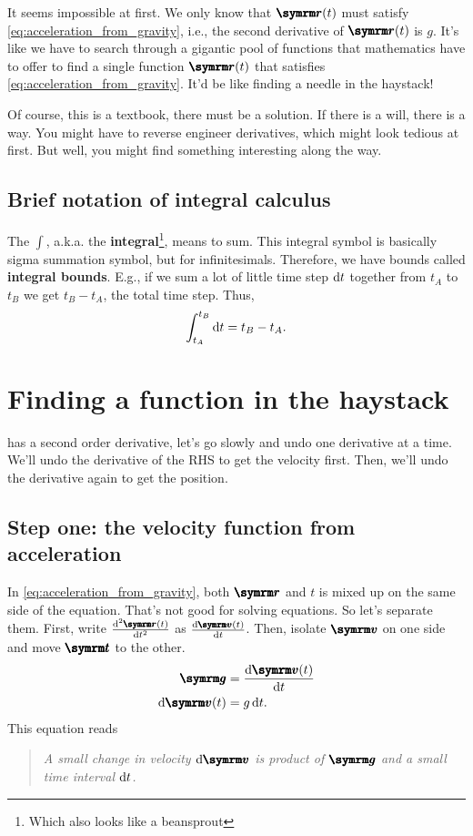 It seems impossible at first. We only know that $\vv{r}(t)$ must satisfy \cref{eq:acceleration_from_gravity}, i.e., the second derivative of $\vv{r}(t)$ is $g$. It's like we have to search through a gigantic pool of functions that mathematics have to offer to find a single function $\vv{r}(t)$ that satisfies \cref{eq:acceleration_from_gravity}. It'd be like finding a needle in the haystack!

Of course, this is a textbook, there must be a solution. If there is a will, there is a way. You might have to reverse engineer derivatives, which might look tedious at first. But well, you might find something interesting along the way.

\subsection{Brief notation of integral calculus}
\label{sec:brief_notation_of_calculus_integral}

The $\int$, a.k.a. the \textbf{integral}\footnote{Which also looks like a beansprout}, means to sum. This integral symbol is basically sigma summation symbol, but for infinitesimals. Therefore, we have bounds called \textbf{integral bounds}. E.g., if we sum a lot of little time step $\odif{t}$ together from $t_A$ to $t_B$ we get $t_B - t_A$, the total time step. Thus,
\begin{equation}
    \int_{t_A}^{t_B}\odif{t} = t_B - t_A.
\end{equation}

\section{Finding a function in the haystack}
\label{sec:function_in_the_haystack}

 has a second order derivative, let's go slowly and undo one derivative at a time. We'll undo the derivative of the RHS to get the velocity first. Then, we'll undo the derivative again to get the position.

\subsection{Step one: the velocity function from acceleration}

In \cref{eq:acceleration_from_gravity}, both $\vv{r}$ and $t$ is mixed up on the same side of the equation. That's not good for solving equations. So let's separate them. First, write $\odv[ord = 2]{\vv{r}(t)}{t}$ as $\odv{\vv{v}(t)}{t}$. Then, isolate $\vv{v}$ on one side and move $\vv{t}$ to the other.
\begin{align}
    \vv{g} &= \odv{\vv{v}(t)}{t} \\
    \odif{\vv{v}}(t) &= g\odif{t}.
\end{align}
This equation reads
\begin{quotation}
    \emph{A small change in velocity $\odif{\vv{v}}$ is product of $\vv{g}$ and a small time interval $\odif{t}$.}
\end{quotation}

